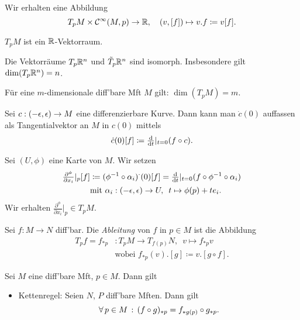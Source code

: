 \documentclass{cheat-sheet}
\begin{document}
\begin{bem}
  Wir erhalten eine Abbildung
  \[
    T_p M \times \mathcal{C}^\infty(M, p) \to \mathbb{R}, \quad
    (v, [f]) \mapsto v.f \coloneqq v[f].
  \]
\end{bem}

\begin{bem}
  $T_p M$ ist ein $\mathbb{R}$-Vektorraum.
\end{bem}

\begin{satz}
  Die Vektorräume $T_p \mathbb{R}^n$ und $\tilde{T}_p \mathbb{R}^n$ sind isomorph. Insbesondere gilt $\dim(T_p \mathbb{R}^n) = n$.
\end{satz}

\begin{kor}
  Für eine $m$-dimensionale diff'bare Mft $M$ gilt: $\dim(T_p M) = m$.
\end{kor}

\begin{bem}
  Sei $c : \left( -\epsilon, \epsilon \right) \to M$ eine differenzierbare Kurve. Dann kann man $\dot{c}(0)$ auffassen als Tangentialvektor an $M$ in $c(0)$ mittels
  \[ \dot{c}(0)[f] \coloneqq \tfrac{\mathrm{d}}{\mathrm{d} t}|_{t=0} (f \circ c). \]
\end{bem}

\begin{bem}
  Sei $(U, \phi)$ eine Karte von $M$. Wir setzen
  \begin{align*}
    \tfrac{\partial^{\phi}}{\partial x_i}|_p [f] & \coloneqq (\phi^{-1} \circ \alpha_i)^{{\cdot}} (0) [f] = \tfrac{\mathrm{d}}{\mathrm{d} t}|_{t=0} (f \circ \phi^{-1} \circ \alpha_i)\\
    & \text{mit } \alpha_i : \left( -\epsilon, \epsilon \right) \to U, \enspace t \mapsto \phi(p) + t e_i.
  \end{align*}
  Wir erhalten $\tfrac{\partial^{\phi}}{\partial x_i}|_p \in T_p M$.
\end{bem}

\begin{defn}
  Sei $f : M \to N$ diff'bar. Die \emph{Ableitung} von $f$ in $p \in M$ ist die Abbildung
  \begin{align*}
    T_p f = f_{*p} &: T_p M \to T_{f(p)} N, \enspace v \mapsto f_{*p} v\\
    & \text{wobei } f_{*p}(v).[g] \coloneqq v.[g \circ f].
  \end{align*}
\end{defn}

\begin{lem}
  Sei $M$ eine diff'bare Mft, $p \in M$. Dann gilt
  \begin{itemize}
    \item Kettenregel: Seien $N$, $P$ diff'bare Mften. Dann gilt
    \[ \forall \, {p \in M} \,:\, (f \circ g)_{*p} = f_{* g(p)} \circ g_{*p}. \]
  \end{itemize}
\end{lem}
\end{document}
